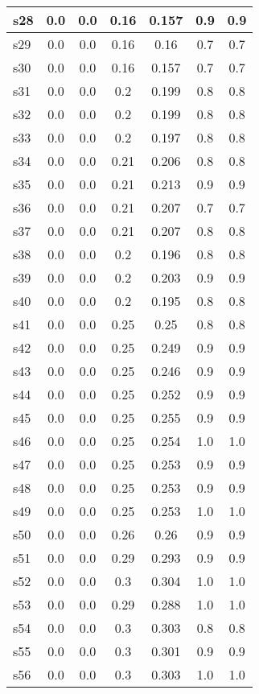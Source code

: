 \documentclass{article}
\begin{document}
\begin{tabular}{|l|c|c|c|c|c|c|}
\hline
s28 &0.0 & 0.0 & 0.16 & 0.157 & 0.9 & 0.9\\
\hline
s29 &0.0 & 0.0 & 0.16 & 0.16 & 0.7 & 0.7\\
\hline
s30 &0.0 & 0.0 & 0.16 & 0.157 & 0.7 & 0.7\\
\hline
s31 &0.0 & 0.0 & 0.2 & 0.199 & 0.8 & 0.8\\
\hline
s32 &0.0 & 0.0 & 0.2 & 0.199 & 0.8 & 0.8\\
\hline
s33 &0.0 & 0.0 & 0.2 & 0.197 & 0.8 & 0.8\\
\hline
s34 &0.0 & 0.0 & 0.21 & 0.206 & 0.8 & 0.8\\
\hline
s35 &0.0 & 0.0 & 0.21 & 0.213 & 0.9 & 0.9\\
\hline
s36 &0.0 & 0.0 & 0.21 & 0.207 & 0.7 & 0.7\\
\hline
s37 &0.0 & 0.0 & 0.21 & 0.207 & 0.8 & 0.8\\
\hline
s38 &0.0 & 0.0 & 0.2 & 0.196 & 0.8 & 0.8\\
\hline
s39 &0.0 & 0.0 & 0.2 & 0.203 & 0.9 & 0.9\\
\hline
s40 &0.0 & 0.0 & 0.2 & 0.195 & 0.8 & 0.8\\
\hline
s41 &0.0 & 0.0 & 0.25 & 0.25 & 0.8 & 0.8\\
\hline
s42 &0.0 & 0.0 & 0.25 & 0.249 & 0.9 & 0.9\\
\hline
s43 &0.0 & 0.0 & 0.25 & 0.246 & 0.9 & 0.9\\
\hline
s44 &0.0 & 0.0 & 0.25 & 0.252 & 0.9 & 0.9\\
\hline
s45 &0.0 & 0.0 & 0.25 & 0.255 & 0.9 & 0.9\\
\hline
s46 &0.0 & 0.0 & 0.25 & 0.254 & 1.0 & 1.0\\
\hline
s47 &0.0 & 0.0 & 0.25 & 0.253 & 0.9 & 0.9\\
\hline
s48 &0.0 & 0.0 & 0.25 & 0.253 & 0.9 & 0.9\\
\hline
s49 &0.0 & 0.0 & 0.25 & 0.253 & 1.0 & 1.0\\
\hline
s50 &0.0 & 0.0 & 0.26 & 0.26 & 0.9 & 0.9\\
\hline
s51 &0.0 & 0.0 & 0.29 & 0.293 & 0.9 & 0.9\\
\hline
s52 &0.0 & 0.0 & 0.3 & 0.304 & 1.0 & 1.0\\
\hline
s53 &0.0 & 0.0 & 0.29 & 0.288 & 1.0 & 1.0\\
\hline
s54 &0.0 & 0.0 & 0.3 & 0.303 & 0.8 & 0.8\\
\hline
s55 &0.0 & 0.0 & 0.3 & 0.301 & 0.9 & 0.9\\
\hline
s56 &0.0 & 0.0 & 0.3 & 0.303 & 1.0 & 1.0\\

\end{tabular}
\end{document}
